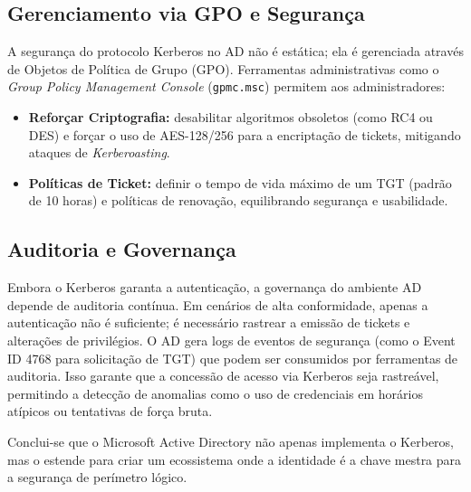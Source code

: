 \subsection{Gerenciamento via GPO e Segurança}
A segurança do protocolo Kerberos no AD não é estática; ela é gerenciada através de Objetos de Política de Grupo (GPO). Ferramentas administrativas como o \textit{Group Policy Management Console} (\texttt{gpmc.msc}) permitem aos administradores:
\begin{itemize}
    \item \textbf{Reforçar Criptografia:} desabilitar algoritmos obsoletos (como RC4 ou DES) e forçar o uso de AES-128/256 para a encriptação de tickets, mitigando ataques de \textit{Kerberoasting}.
    \item \textbf{Políticas de Ticket:} definir o tempo de vida máximo de um TGT (padrão de 10 horas) e políticas de renovação, equilibrando segurança e usabilidade.
\end{itemize}

\subsection{Auditoria e Governança}
Embora o Kerberos garanta a autenticação, a governança do ambiente AD depende de auditoria contínua. Em cenários de alta conformidade, apenas a autenticação não é suficiente; é necessário rastrear a emissão de tickets e alterações de privilégios.
O AD gera logs de eventos de segurança (como o Event ID 4768 para solicitação de TGT) que podem ser consumidos por ferramentas de auditoria. Isso garante que a concessão de acesso via Kerberos seja rastreável, permitindo a detecção de anomalias como o uso de credenciais em horários atípicos ou tentativas de força bruta.

Conclui-se que o Microsoft Active Directory não apenas implementa o Kerberos, mas o estende para criar um ecossistema onde a identidade é a chave mestra para a segurança de perímetro lógico.